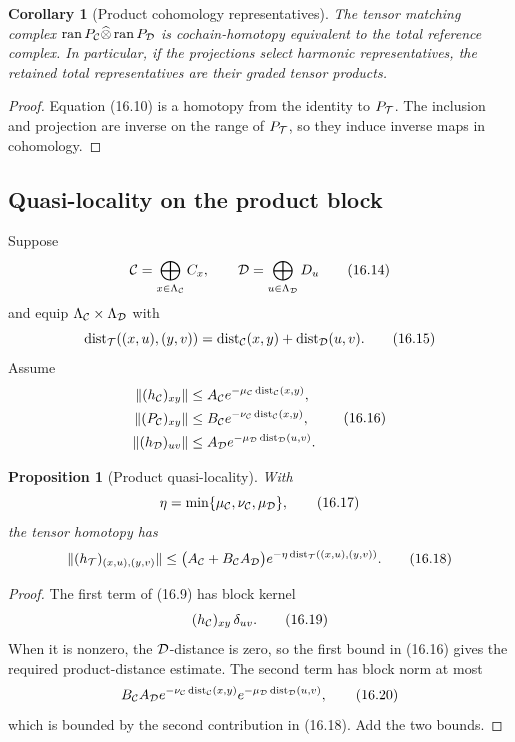 \documentclass[11pt]{article}
\newtheorem{proposition}[theorem]{Proposition}
\newtheorem{corollary}[theorem]{Corollary}
\theoremstyle{remark}
\begin{document}
\begin{corollary}[Product cohomology representatives]
\label{cor:v12v16-cohomology}
The tensor matching complex
\(\operatorname{ran}P_{\cal C}\widehat\otimes
 \operatorname{ran}P_{\cal D}\)
is cochain-homotopy equivalent to the total reference complex.
In particular, if the projections select harmonic representatives,
the retained total representatives are their graded tensor
products.
\end{corollary}

\begin{proof}
Equation (16.10) is a homotopy from the identity to
\(P_{\cal T}\).  The inclusion and projection are inverse on the
range of \(P_{\cal T}\), so they induce inverse maps in cohomology.
\end{proof}

\subsection{Quasi-locality on the product block}

Suppose
\[
 {\cal C}=\bigoplus_{x\in\Lambda_{\cal C}}C_x,\qquad
 {\cal D}=\bigoplus_{u\in\Lambda_{\cal D}}D_u               \tag{16.14}
\]
and equip
\(\Lambda_{\cal C}\times\Lambda_{\cal D}\) with
\[
 \operatorname{dist}_{\cal T}((x,u),(y,v))
 =
 \operatorname{dist}_{\cal C}(x,y)+
 \operatorname{dist}_{\cal D}(u,v).                        \tag{16.15}
\]
Assume
\[
\begin{split}
 \|(h_{\cal C})_{xy}\|&\le A_{\cal C}
 e^{-\mu_{\cal C}\operatorname{dist}_{\cal C}(x,y)},\\
 \|(P_{\cal C})_{xy}\|&\le B_{\cal C}
 e^{-\nu_{\cal C}\operatorname{dist}_{\cal C}(x,y)},\\
 \|(h_{\cal D})_{uv}\|&\le A_{\cal D}
 e^{-\mu_{\cal D}\operatorname{dist}_{\cal D}(u,v)}.
\end{split}                                                  \tag{16.16}
\]

\begin{proposition}[Product quasi-locality]
\label{prop:v12v16-local}
With
\[
 \eta=\min\{\mu_{\cal C},\nu_{\cal C},\mu_{\cal D}\},       \tag{16.17}
\]
the tensor homotopy has
\[
 \|(h_{\cal T})_{(x,u),(y,v)}\|
 \le
 \bigl(A_{\cal C}+B_{\cal C}A_{\cal D}\bigr)
 e^{-\eta\operatorname{dist}_{\cal T}((x,u),(y,v))}.        \tag{16.18}
\]
\end{proposition}

\begin{proof}
The first term of (16.9) has block kernel
\[
 (h_{\cal C})_{xy}\,\delta_{uv}.                            \tag{16.19}
\]
When it is nonzero, the \({\cal D}\)-distance is zero, so the first
bound in (16.16) gives the required product-distance estimate.
The second term has block norm at most
\[
 B_{\cal C}A_{\cal D}
 e^{-\nu_{\cal C}\operatorname{dist}_{\cal C}(x,y)}
 e^{-\mu_{\cal D}\operatorname{dist}_{\cal D}(u,v)},        \tag{16.20}
\]
which is bounded by the second contribution in (16.18).  Add the two
bounds.
\end{proof}
\end{document}
